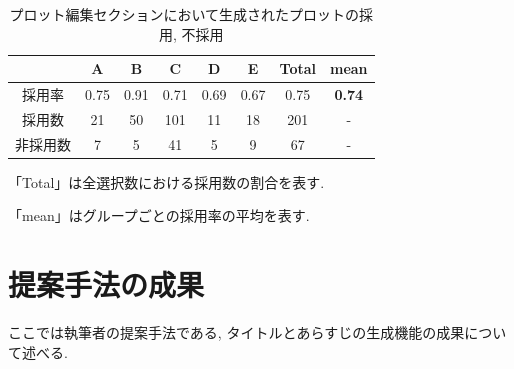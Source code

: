 \documentclass[a4j,12pt]{jsreport}
\begin{document}



\begin{table}[H]
   \begin{center}
   \caption{プロット編集セクションにおいて生成されたプロットの採用, 不採用}
   \label{tab:adopt}
   \begin{tabular}{cccccccc} \hline
   & A & B & C & D & E & Total & mean \\ \hline
   採用率 & 0.75 & 0.91 & 0.71 & 0.69 & 0.67 & 0.75 & \textbf{0.74}\\
   採用数 & 21 & 50 & 101 & 11 & 18 & 201 & -\\
   非採用数 & 7 & 5 & 41 & 5 & 9 & 67 & -\\
   \hline
   \end{tabular}
   \end{center}
   \begin{tablenotes}
   \footnotesize
   \item 「Total」は全選択数における採用数の割合を表す.
   \item 「mean」はグループごとの採用率の平均を表す.
   \end{tablenotes}
\end{table}

\section{提案手法の成果}\label{self_result}
ここでは執筆者の提案手法である, タイトルとあらすじの生成機能の成果について述べる.
\end{document}
